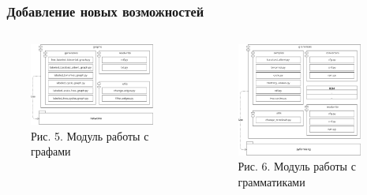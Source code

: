 \begin{frame}[fragile]
	\transwipe[direction=90]
	\frametitle{\faCode\ Добавление новых возможностей}
	
	\begin{columns}
        \begin{column}{0.5\textwidth}
            \begin{figure}[t]{\textwidth}
				\centering
				\includegraphics[width=0.96\textwidth]{img/graphs.pdf}
				\caption*{Рис. 5. Модуль работы с графами} \label{fig:graphs}
			\end{figure}
        \end{column}

        \begin{column}{0.5\textwidth}
            \begin{figure}[t]{\textwidth}
				\centering
				\includegraphics[width=0.96\textwidth]{img/grammars.pdf}
				\caption*{Рис. 6. Модуль работы с грамматиками} \label{fig:grammars}
			\end{figure}
        \end{column}
    \end{columns}
\end{frame}
